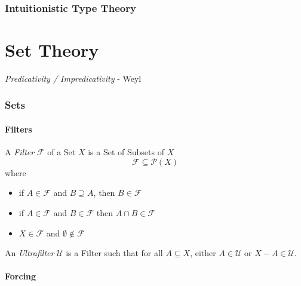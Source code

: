 \documentclass{article}
\begin{document}
\section{Intuitionistic Type Theory}

\part{Set Theory}

\emph{Predicativity / Impredicativity} - Weyl

\section{Sets}\label{sec:sets}

\subsection{Filters}

A \emph{Filter} $\mathcal{F}$ of a Set $X$ is a Set of Subsets of $X$
\[
    \mathcal{F} \subseteq \mathcal{P}(X)
\]
where
\begin{itemize}
\item if $A \in \mathcal{F}$ and $B \supseteq A$, then $B \in
  \mathcal{F}$
\item if $A \in \mathcal{F}$ and $B \in \mathcal{F}$ then $A \cap B
  \in \mathcal{F}$
\item $X \in \mathcal{F}$ and $\emptyset \notin \mathcal{F}$
\end{itemize}
An \emph{Ultrafilter} $\mathcal{U}$ is a Filter such that for all $A
\subseteq X$, either $A \in \mathcal{U}$ or $X - A \in \mathcal{U}$.

\subsection{Forcing}\label{subsec:forcing}
\end{document}

